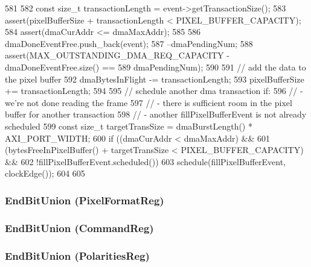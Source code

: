 \begin{DoxyCode}
581 {
582     const size_t transactionLength = event->getTransactionSize();
583     assert(pixelBufferSize + transactionLength < PIXEL_BUFFER_CAPACITY);
584     assert(dmaCurAddr <= dmaMaxAddr);
585 
586     dmaDoneEventFree.push_back(event);
587     --dmaPendingNum;
588     assert(MAX_OUTSTANDING_DMA_REQ_CAPACITY - dmaDoneEventFree.size() ==
589             dmaPendingNum);
590 
591     // add the data to the pixel buffer
592     dmaBytesInFlight -= transactionLength;
593     pixelBufferSize += transactionLength;
594 
595     // schedule another dma transaction if:
596     // - we're not done reading the frame
597     // - there is sufficient room in the pixel buffer for another transaction
598     // - another fillPixelBufferEvent is not already scheduled
599     const size_t targetTransSize = dmaBurstLength() * AXI_PORT_WIDTH;
600     if ((dmaCurAddr < dmaMaxAddr) &&
601         (bytesFreeInPixelBuffer() + targetTransSize < PIXEL_BUFFER_CAPACITY) &&
602         !fillPixelBufferEvent.scheduled()) {
603         schedule(fillPixelBufferEvent, clockEdge());
604     }
605 }
\end{DoxyCode}
\hypertarget{classHDLcd_af0dba6bcb7a2dfa9fffb850df381fb35}{
\subsubsection[{EndBitUnion}]{\setlength{\rightskip}{0pt plus 5cm}EndBitUnion (PixelFormatReg)}}
\label{classHDLcd_af0dba6bcb7a2dfa9fffb850df381fb35}
\hypertarget{classHDLcd_ad18895590b07f37749435b9fcab06a1b}{
\subsubsection[{EndBitUnion}]{\setlength{\rightskip}{0pt plus 5cm}EndBitUnion ({\bf CommandReg})}}
\label{classHDLcd_ad18895590b07f37749435b9fcab06a1b}
\hypertarget{classHDLcd_a15872640ef504c5434a0d6d2f8d1370f}{
\subsubsection[{EndBitUnion}]{\setlength{\rightskip}{0pt plus 5cm}EndBitUnion (PolaritiesReg)}}
